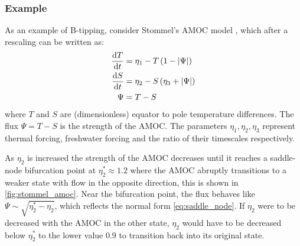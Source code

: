 \subsubsection{Example}
As an example of B-tipping, consider Stommel's AMOC model \parencite{STOMMEL1961}, which after a rescaling \parencite{Dijkstra2011} can be written as:
\begin{subequations}
  \label{eq:stommel_amoc}
  \begin{align}
    \dv{T}{t} &= \eta_1 - T\left(1 - \left|\Psi\right|\right) \\
    \dv{S}{t} &= \eta_2 - S\left(\eta_3 + \left|\Psi\right|\right) \\
    \Psi      &= T - S
  \end{align}
\end{subequations}
where $T$ and $S$ are (dimensionless) equator to pole temperature differences. The flux $\Psi = T - S$ is the strength of the AMOC. The parameters $\eta_1,\eta_2,\eta_3$ represent
thermal forcing, freshwater forcing and the ratio of their timescales respectively.

As $\eta_2$ is increased the strength of the AMOC decreases until it reaches a saddle-node bifurcation point
at $\eta_2^*  \approx 1.2$ where the AMOC abruptly transitions to a weaker state with flow in the opposite direction,
this is shown in \cref{fig:stommel_amoc}. Near the bifurcation point, the flux behaves like $\Psi \sim \sqrt{\eta_2^*-\eta_2}$,
which reflects the normal form \cref{eq:saddle_node}. If $\eta_2$ were to be decreased with the AMOC in the other state, $\eta_2$ would have to be decreased below
$\eta_2^*$ to the lower value $0.9$ to transition back into its original state.



